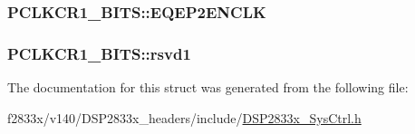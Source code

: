 \subsubsection[{E\+Q\+E\+P2\+E\+N\+C\+L\+K}]{ P\+C\+L\+K\+C\+R1\+\_\+\+B\+I\+T\+S\+::\+E\+Q\+E\+P2\+E\+N\+C\+L\+K}\label{struct_p_c_l_k_c_r1___b_i_t_s_ae405ac54ad8fe86b84563ff3bf601fea}
\hypertarget{struct_p_c_l_k_c_r1___b_i_t_s_a6783f7db0507a92abbb8a8954437acf1}{}
\subsubsection[{rsvd1}]{ P\+C\+L\+K\+C\+R1\+\_\+\+B\+I\+T\+S\+::rsvd1}\label{struct_p_c_l_k_c_r1___b_i_t_s_a6783f7db0507a92abbb8a8954437acf1}


The documentation for this struct was generated from the following file\+:\begin{DoxyCompactItemize}
\item 
f2833x/v140/\+D\+S\+P2833x\+\_\+headers/include/\hyperlink{_d_s_p2833x___sys_ctrl_8h}{D\+S\+P2833x\+\_\+\+Sys\+Ctrl.\+h}\end{DoxyCompactItemize}
